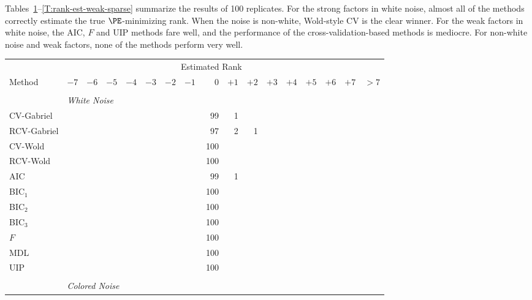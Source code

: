 Tables~\ref{T:rank-est-strong-gauss}--\ref{T:rank-est-weak-sparse} summarize
the results of 100 replicates.  For the strong factors in white noise, almost
all of the methods correctly estimate the true $\PE$-minimizing rank.  When the noise is non-white, Wold-style CV is the clear winner.  For the weak factors in white noise, the AIC, $F$ and UIP methods fare well, and the performance of the cross-validation-based methods is mediocre.  For non-white noise and weak factors, none of the methods perform very well.

\begin{table}\label{T:rank-est-strong-gauss}
    \tiny
    \centering    
    \begin{tabular}{lrrrrrrrrrrrrrrrr}
        \toprule
        &\multicolumn{15}{c}{\scriptsize{Estimated Rank}} \\
        \cmidrule{2-17}
        \scriptsize{Method}
            & $-7$ & $-6$ & $-5$ & $-4$ & $-3$ & $-2$ & $-1$ 
            & $\phantom{+}0$ 
            & $+1$ & $+2$ & $+3$ & $+4$ & $+5$ & $+6$ & $+7$ & $> 7$ \\
        \midrule
        \\
        &\multicolumn{16}{l}{\scriptsize{\textit{White Noise}}} \\
 CV-Gabriel &  &  &  &  &  &  &  &  99 &  1 &  &  &  &  &  &  & \\ 
 RCV-Gabriel &  &  &  &  &  &  &  &  97 &  2 &  1 &  &  &  &  &  & \\ 
 CV-Wold &  &  &  &  &  &  &  &  100 &  &  &  &  &  &  &  & \\ 
 RCV-Wold &  &  &  &  &  &  &  &  100 &  &  &  &  &  &  &  & \\ 
 AIC &  &  &  &  &  &  &  &  99 &  1 &  &  &  &  &  &  & \\ 
 BIC$_1$ &  &  &  &  &  &  &  &  100 &  &  &  &  &  &  &  & \\ 
 BIC$_2$ &  &  &  &  &  &  &  &  100 &  &  &  &  &  &  &  & \\ 
 BIC$_3$ &  &  &  &  &  &  &  &  100 &  &  &  &  &  &  &  & \\ 
 $F$ &  &  &  &  &  &  &  &  100 &  &  &  &  &  &  &  & \\ 
 MDL &  &  &  &  &  &  &  &  100 &  &  &  &  &  &  &  & \\ 
 UIP &  &  &  &  &  &  &  &  100 &  &  &  &  &  &  &  & \\ 
         \\
        &\multicolumn{16}{l}{\scriptsize{\textit{Colored Noise}}} \\

\end{tabular}
\end{table}
